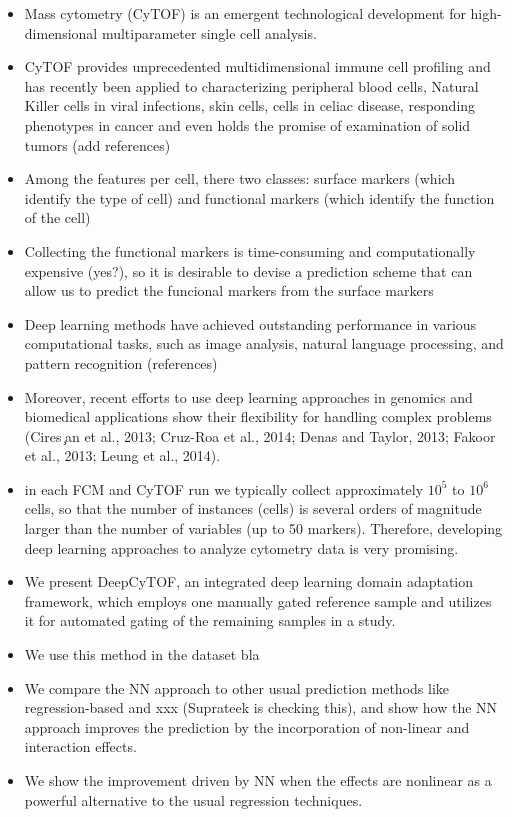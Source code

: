 \documentclass[graybox]{svmult}
\begin{document}
\begin{itemize}
\item Mass cytometry (CyTOF) is an emergent technological development
  for high-dimensional multiparameter single cell analysis.
\item CyTOF provides unprecedented multidimensional immune cell
  profiling and has recently been applied to characterizing peripheral
  blood cells, Natural Killer cells in viral infections, skin cells,
  cells in celiac disease, responding phenotypes in cancer and even
  holds the promise of examination of solid tumors (add references)
\item Among the features per cell, there two classes: surface markers
  (which identify the type of cell) and functional markers (which
  identify the function of the cell)
\item Collecting the functional markers is time-consuming and
  computationally expensive (yes?), so it is desirable to devise a
  prediction scheme that can allow us to predict the funcional markers
  from the surface markers
\item Deep learning methods have achieved outstanding performance in
  various computational tasks, such as image analysis, natural
  language processing, and pattern recognition (references)
\item Moreover, recent efforts to use deep learning approaches in
  genomics and biomedical applications show their flexibility for
  handling complex problems (Cires ̧an et al., 2013; Cruz-Roa et al.,
  2014; Denas and Taylor, 2013; Fakoor et al., 2013; Leung et al.,
  2014).
\item in each FCM and CyTOF run we typically collect approximately $10^5$
  to $10^6$ cells, so that the number of instances (cells) is several
  orders of magnitude larger than the number of variables (up to 50
  markers). Therefore, developing deep learning approaches to analyze
  cytometry data is very promising.
\item We present DeepCyTOF, an integrated deep learning domain
  adaptation framework, which employs one manually gated reference
  sample and utilizes it for automated gating of the remaining samples
  in a study.
\item We use this method in the dataset bla
\item We compare the NN approach to other usual prediction methods
  like regression-based and xxx (Suprateek is checking this), and show
  how the NN approach improves the prediction by the incorporation of
  non-linear and interaction effects.
\item We show the improvement driven by NN when the effects are
  nonlinear as a powerful alternative to the usual regression techniques.
\end{itemize}
\end{document}
